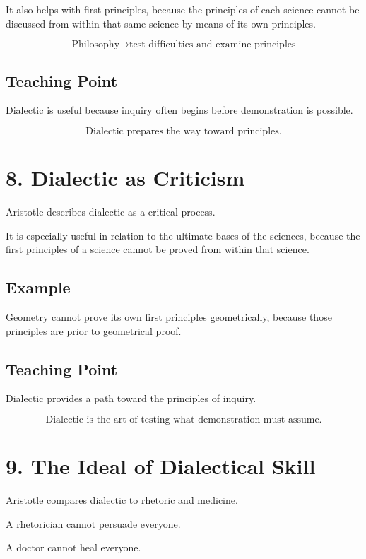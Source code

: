 \documentclass[12pt]{article}
\begin{document}
It also helps with first principles, because the principles of each science
cannot be discussed from within that same science by means of its own
principles.

\[
\boxed{
\text{Philosophy} \rightarrow \text{test difficulties and examine principles}
}
\]

\subsection*{Teaching Point}

Dialectic is useful because inquiry often begins before demonstration is
possible.

\[
\boxed{
\text{Dialectic prepares the way toward principles.}
}
\]

\section*{8. Dialectic as Criticism}

Aristotle describes dialectic as a critical process.

It is especially useful in relation to the ultimate bases of the sciences,
because the first principles of a science cannot be proved from within that
science.

\subsection*{Example}

Geometry cannot prove its own first principles geometrically, because those
principles are prior to geometrical proof.

\subsection*{Teaching Point}

Dialectic provides a path toward the principles of inquiry.

\[
\boxed{
\text{Dialectic is the art of testing what demonstration must assume.}
}
\]

\section*{9. The Ideal of Dialectical Skill}

Aristotle compares dialectic to rhetoric and medicine.

A rhetorician cannot persuade everyone.

A doctor cannot heal everyone.
\end{document}
